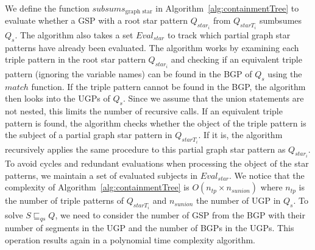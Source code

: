 We define the function $subsums_{\text{graph star}}$ in Algorithm~\ref{alg:containmentTree} to evaluate whether a GSP with a root star pattern $Q_{star_i}$ from $Q_{starT_i}$ sumbsumes $Q_s$. 
The algorithm also takes a set $Eval_{star}$ to track which partial graph star patterns have already been evaluated.
The algorithm works by examining each triple pattern in the root star pattern $Q_{star_i}$ and checking if an equivalent triple pattern (ignoring the variable names) can be found in the BGP of $Q_s$ using the $match$ function.
If the triple pattern cannot be found in the BGP, the algorithm then looks into the UGPs of $Q_s$. 
Since we assume that the union statements are not nested, this limits the number of recursive calls.
If an equivalent triple pattern is found, the algorithm checks whether the object of the triple pattern is the subject of a partial graph star pattern in $Q_{starT_i}$.
If it is, the algorithm recursively applies the same procedure to this partial graph star pattern as $Q_{star_i}$.
To avoid cycles and redundant evaluations when processing the object of the star patterns, we maintain a set of evaluated subjects in $Eval_{star}$.
We notice that the complexity of Algorithm~\ref{alg:containmentTree} is $O(n_{tp} \times n_{sunion})$
where $n_{tp}$ is the number of triple patterns of $Q_{starT_i}$ and $n_{sunion}$ the number of UGP in $Q_s$.
To solve $S \sqsubseteq_{qs} Q$, we need to consider the number of GSP from the BGP with their number of segments in the UGP and the number of BGPs in the UGPs.
This operation results again in a polynomial time complexity algorithm.
